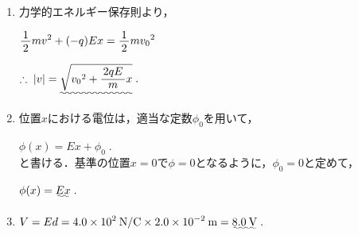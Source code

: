 \documentclass[../../../uem_phy_std_a.tex]{subfiles}
\begin{document}
    \begin{enumerate}
        \item%
            力学的エネルギー保存則より，
        
            \myspaceb%
            $\displaystyle
                \myfraca{1}{2}mv^2 + (-q) Ex = \myfraca{1}{2}m{v_0}^2%
            $

            \myspaceb%
            $\displaystyle
                \therefore \; |v|=\uwave{\sqrt{{v_0}^2 + \myfracd{2qE}{m}x}} \;.%
            $
        \item%
            位置$x$における電位は，適当な定数$\phi_0$を用いて，
        
            \myspaceb%
            $\displaystyle
                \phi(x) = Ex + \phi_0 \;.%
            $\\ 
            と書ける．基準の位置$x=0$で$\phi=0$となるように，$\phi_0=0$と定めて，
            
            \myspaceb%
            $\displaystyle
                \phi(x) = \uwave{Ex} \;.%
            $
        \item%
            \myspaceb%
            $\displaystyle
                V = Ed = 4.0 \times 10^2\:\mathrm{N/C}%
                \times 2.0 \times 10^{-2}\:\mathrm{m} = \uwave{8.0\:\mathrm{V}} \;.
            $
    \end{enumerate}
\end{document}
